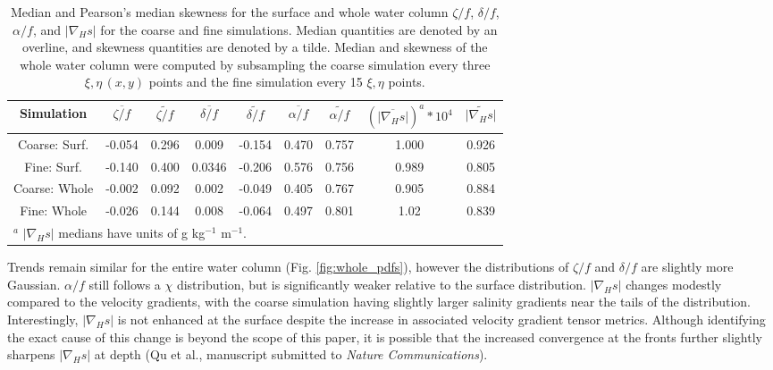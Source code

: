 \documentclass[draft]{agujournal2019}
\begin{document}
 \begin{table}
    \caption{Median and Pearson's median skewness for the surface and whole water column $\zeta/f$, $\delta/f$, $\alpha/f$, and $|\nabla_H s|$ for the coarse and fine simulations. Median quantities are denoted by an overline, and skewness quantities are denoted by a tilde. Median and skewness of the whole water column were computed by subsampling the coarse simulation every three $\xi, \eta \, (x,y)$ points and the fine simulation every 15 $\xi, \eta$ points.}
    \centering
        \begin{tabular}{c c c c c c c c c}
        \hline
         Simulation & $\overline{\zeta/f}$ & $\widetilde{\zeta/f}$  & $\overline{\delta/f}$ &
         $\widetilde{\delta/f}$ &
         $\overline{\alpha/f}$  &
         $\widetilde{\alpha/f}$ & 
         $(\overline{|\nabla_H s|})^a*10^4$  &
         $\widetilde{|\nabla_H s|}$ \\
        \hline
         Coarse: Surf. & -0.054 & 0.296 & 0.009 & -0.154 & 0.470 & 0.757 & 1.000 & 0.926 \\
         Fine: Surf. & -0.140 & 0.400 & 0.0346 & -0.206 & 0.576 & 0.756 & 0.989 & 0.805 \\
         Coarse: Whole & -0.002 & 0.092 & 0.002 & -0.049 & 0.405 & 0.767 & 0.905 & 0.884 \\
         Fine: Whole &  -0.026 & 0.144 & 0.008 & -0.064 & 0.497 & 0.801 & 1.02 & 0.839 \\
        \hline
        \multicolumn{9}{l}{$^{a}$ $|\nabla_H s|$ medians have units of g kg$^{-1}$ m$^{-1}$. }
         \end{tabular} 
         \label{tab:1}
 \end{table}
 
Trends remain similar for the entire water column (Fig. \ref{fig:whole_pdfs}), however the distributions of $\zeta/f$ and $\delta/f$ are slightly more Gaussian. $\alpha/f$ still follows a $\chi$ distribution, but is significantly weaker relative to the surface distribution.  $|\nabla_H s|$ changes modestly compared to the velocity gradients, with the coarse simulation having slightly larger salinity gradients near the tails of the distribution. Interestingly, $|\nabla_H s|$ is not enhanced at the surface despite the increase in associated velocity gradient tensor metrics. Although identifying the exact cause of this change is beyond the scope of this paper, it is possible that the increased convergence at the fronts further slightly sharpens $|\nabla_H s|$ at depth (Qu et al., manuscript submitted to \textit{Nature Communications}).  
\end{document}
